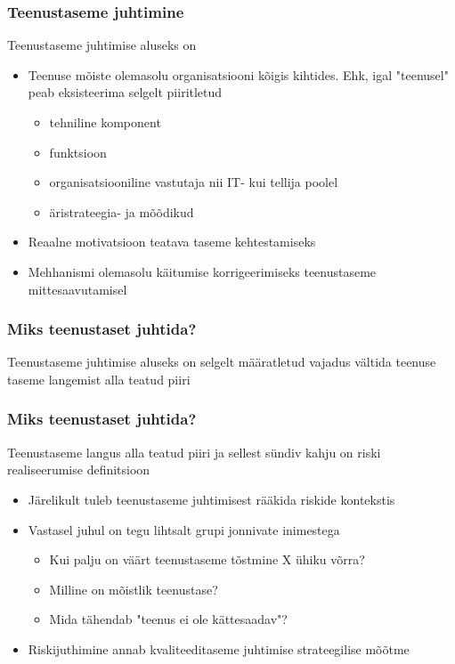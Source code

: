 \begin{frame}[fragile]
  \frametitle{Teenustaseme juhtimine}
	Teenustaseme juhtimise aluseks on 
		\begin{itemize}
			\item Teenuse mõiste olemasolu organisatsiooni kõigis kihtides. Ehk, igal "teenusel" peab eksisteerima selgelt piiritletud
			\begin{itemize}
				\item tehniline komponent
				\item funktsioon
				\item organisatsiooniline vastutaja nii IT- kui tellija poolel
				\item äristrateegia- ja mõõdikud
			\end{itemize}		
			\item Reaalne motivatsioon teatava taseme kehtestamiseks
			\item Mehhanismi olemasolu käitumise korrigeerimiseks teenustaseme mittesaavutamisel
		\end{itemize}		
\end{frame}

\begin{frame}[fragile]
  \frametitle{Miks teenustaset juhtida?}
	\begin{center}
		Teenustaseme juhtimise aluseks on selgelt määratletud vajadus vältida teenuse taseme langemist alla teatud piiri
	\end{center}
\end{frame}


\begin{frame}[fragile]
  \frametitle{Miks teenustaset juhtida?}
  	Teenustaseme langus alla teatud piiri ja sellest sündiv kahju on riski realiseerumise definitsioon
		\begin{itemize}
			\item Järelikult tuleb teenustaseme juhtimisest rääkida riskide kontekstis
			\item Vastasel juhul on tegu lihtsalt grupi jonnivate inimestega
			\begin{itemize}
				\item Kui palju on väärt teenustaseme tõstmine X ühiku võrra?
				\item Milline on mõistlik teenustase?
				\item Mida tähendab "teenus ei ole kättesaadav"?
			\end{itemize}
			\item Riskijuthimine annab kvaliteeditaseme juhtimise strateegilise mõõtme 
		\end{itemize}		
\end{frame}

